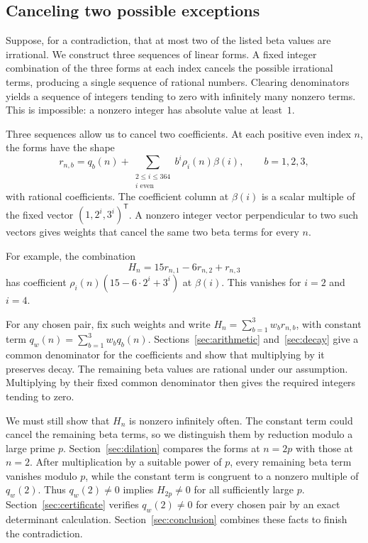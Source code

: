 \begin{samepage}
\subsection{Canceling two possible exceptions}

Suppose, for a contradiction, that at most two of the listed beta values
are irrational. We construct three sequences of linear forms. A fixed
integer combination of the three forms at each index cancels the
possible irrational terms, producing a single sequence of rational
numbers. Clearing denominators yields a sequence
of integers tending to zero with infinitely many nonzero terms. This is
impossible: a
nonzero integer has absolute value at least~$1$.\par
\end{samepage}

\begin{samepage}
Three sequences allow us to cancel two coefficients. At each positive
even index $n$, the forms have the shape
\begin{equation}\label{eq:preview}
 r_{n,b}=q_b(n)+\sum_{\substack{2\leq i\leq364\\i\text{ even}}}
                  b^i\rho_i(n)\beta(i),\qquad b=1,2,3,
\end{equation}
with rational coefficients. The coefficient column at $\beta(i)$ is a
scalar multiple of the fixed vector $(1,2^i,3^i)^{\mathsf T}$.
A nonzero integer vector perpendicular to two such vectors gives
weights that cancel the same two beta terms for every $n$.
\end{samepage}

\begin{samepage}
For example, the combination
\[
 H_n=15r_{n,1}-6r_{n,2}+r_{n,3}
\]
has coefficient $\rho_i(n)(15-6\cdot2^i+3^i)$ at $\beta(i)$.
This vanishes for $i=2$ and $i=4$.
\end{samepage}

For any chosen pair, fix such weights and write
$H_n=\sum_{b=1}^3w_br_{n,b}$, with constant term
$q_w(n)=\sum_{b=1}^3w_bq_b(n)$. Sections~\ref{sec:arithmetic}
and~\ref{sec:decay} give a common denominator for the coefficients and
show that multiplying by it preserves decay. The remaining beta values
are rational under our assumption. Multiplying by their fixed common
denominator then gives the required integers tending to zero.

We must still show that $H_n$ is nonzero infinitely often. The constant
term could cancel the remaining beta terms, so we distinguish them by
reduction modulo a large prime $p$. Section~\ref{sec:dilation} compares
the forms at $n=2p$ with those at $n=2$. After multiplication by a
suitable power of $p$, every remaining beta term vanishes modulo $p$,
while the constant term is congruent to a nonzero multiple of $q_w(2)$.
Thus $q_w(2)\ne0$ implies $H_{2p}\ne0$ for all sufficiently large $p$.
Section~\ref{sec:certificate} verifies $q_w(2)\ne0$ for every chosen
pair by an exact determinant calculation. Section~\ref{sec:conclusion}
combines these facts to finish the contradiction.


